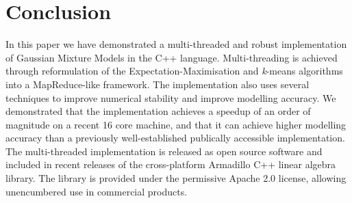 \section{Conclusion}


In this paper we have demonstrated a multi-threaded and robust implementation
of Gaussian Mixture Models in the C++ language.
Multi-threading is achieved through reformulation of the Expectation-Maximisation and {\it k}-means algorithms into a MapReduce-like framework.
The implementation also uses several techniques to improve numerical stability and improve modelling accuracy.
We demonstrated that the implementation achieves a speedup of an order of magnitude on a recent 16 core machine,
and that it can achieve higher modelling accuracy than a previously well-established publically accessible implementation.
The multi-threaded implementation is released as open source software
and included in recent releases of the cross-platform Armadillo C++ linear algebra library.
The library is provided under the permissive Apache 2.0 license, allowing unencumbered use in commercial products.
  
